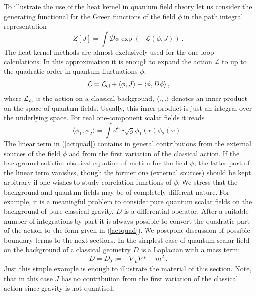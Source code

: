 To illustrate the use of the heat kernel in quantum field theory
let us
consider the generating functional for the Green functions of the 
field $\phi$ in the path integral representation
\begin{equation}
Z[J]=\int \mathcal{D} \phi \exp (-\mathcal{L}(\phi,J)) \ . \label{pathint}
\end{equation}
The heat kernel methods are almost exclusively
used for the one-loop calculations. In this approximation it is enough
to expand the action $\mathcal{L}$ to up to the quadratic order in quantum 
fluctuations $\phi$.
\begin{equation}
\mathcal{L}=\mathcal{L}_{\rm cl} + \langle \phi ,J \rangle +
\langle \phi, D\phi \rangle \,,\label{actquad}
\end{equation}
where $\mathcal{L}_{\rm cl}$ is the action on a classical background,
$\langle .,.\rangle$ denotes an inner product on the space of quantum
fields. Usually, this inner product is just an integral over the underlying
space. For real one-component scalar fields it reads
\begin{equation}
\langle \phi_1, \phi_2 \rangle =\int d^n x \sqrt{g} \phi_1(x)\phi_2(x)
\,.\label{inprosca}
\end{equation}
The linear term in (\ref{actquad}) contains in general contributions
from the external sources of the field $\phi$ and from the first 
variation of the classical action. If the background satisfies 
classical equation of motion for the field $\phi$, the latter part
of the linear term vanishes, though the former one (external sources)
should be kept arbitrary if one wishes to study correlation functions
of $\phi$. We stress that the background and quantum fields may be of
completely different nature. For example, it is a meaningful problem
to consider pure quantum scalar fields on the background of pure
classical gravity. $D$ is a differential operator. After a suitable 
number of integrations by part it is always possible to convert the
quadratic part of the action to the form given in (\ref{actquad}).
We postpone discussion of possible boundary terms to the next
sections. In the simplest case of quantum scalar field on the background
of a classical geometry
$D$ is a Laplacian with a mass term:
\begin{equation}
D=D_0:=-\nabla_\mu\nabla^\mu +m^2 \,.\label{simplestD}
\end{equation}
Just this simple example is enough to illustrate the material of this
section. Note, that in this case $J$ has no contribution from
the first variation of the classical action since gravity is not
quantised.


